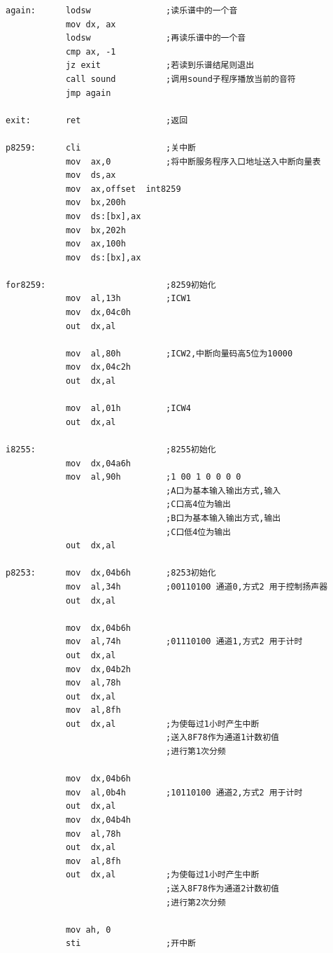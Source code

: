 \documentclass[11pt]{article}
\begin{document}
\begin{center}
\begin{lstlisting}[caption = {代码清单}, label = {lst: code}]
again:      lodsw               ;读乐谱中的一个音
            mov dx, ax
            lodsw               ;再读乐谱中的一个音
            cmp ax, -1
            jz exit             ;若读到乐谱结尾则退出
            call sound          ;调用sound子程序播放当前的音符
            jmp again

exit:       ret                 ;返回

p8259:      cli                 ;关中断
            mov  ax,0           ;将中断服务程序入口地址送入中断向量表
            mov  ds,ax
            mov  ax,offset  int8259
            mov  bx,200h
            mov  ds:[bx],ax
            mov  bx,202h
            mov  ax,100h
            mov  ds:[bx],ax

for8259:                        ;8259初始化
            mov  al,13h         ;ICW1
            mov  dx,04c0h
            out  dx,al

            mov  al,80h         ;ICW2,中断向量码高5位为10000
            mov  dx,04c2h
            out  dx,al

            mov  al,01h         ;ICW4
            out  dx,al

i8255:                          ;8255初始化
            mov  dx,04a6h
            mov  al,90h         ;1 00 1 0 0 0 0
                                ;A口为基本输入输出方式,输入
                                ;C口高4位为输出
                                ;B口为基本输入输出方式,输出
                                ;C口低4位为输出
            out  dx,al

p8253:      mov  dx,04b6h       ;8253初始化
            mov  al,34h         ;00110100 通道0,方式2 用于控制扬声器
            out  dx,al

            mov  dx,04b6h
            mov  al,74h         ;01110100 通道1,方式2 用于计时
            out  dx,al
            mov  dx,04b2h
            mov  al,78h
            out  dx,al
            mov  al,8fh
            out  dx,al          ;为使每过1小时产生中断
                                ;送入8F78作为通道1计数初值
                                ;进行第1次分频

            mov  dx,04b6h
            mov  al,0b4h        ;10110100 通道2,方式2 用于计时
            out  dx,al
            mov  dx,04b4h
            mov  al,78h
            out  dx,al
            mov  al,8fh
            out  dx,al          ;为使每过1小时产生中断
                                ;送入8F78作为通道2计数初值
                                ;进行第2次分频

            mov ah, 0
            sti                 ;开中断


\end{lstlisting}
\end{center}
\end{document}
